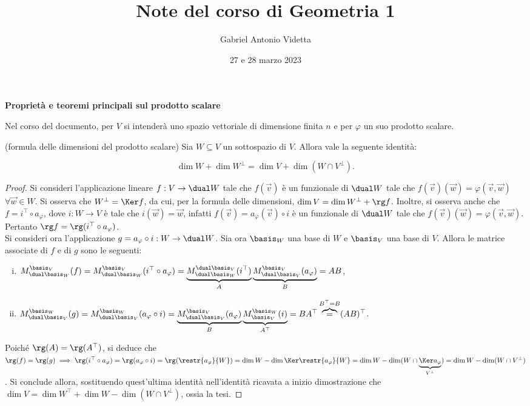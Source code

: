 \documentclass[11pt]{article}
\title{\textbf{Note del corso di Geometria 1}}
\author{Gabriel Antonio Videtta}
\date{27 e 28 marzo 2023}
\begin{document}
	
	\maketitle
	
	\begin{center}
		\Large \textbf{Proprietà e teoremi principali sul prodotto scalare}
	\end{center}
	
	\begin{note}
		Nel corso del documento, per $V$ si intenderà uno spazio vettoriale di dimensione
		finita $n$ e per $\varphi$ un suo prodotto scalare.
	\end{note}
	
	\begin{proposition} (formula delle dimensioni del prodotto scalare)
		Sia $W \subseteq V$ un sottospazio di $V$. Allora vale la seguente identità:
		
		\[ \dim W + \dim W^\perp = \dim V + \dim (W \cap V^\perp). \]
	\end{proposition}

	\begin{proof}
		Si consideri l'applicazione lineare $f : V \to \dual W$ tale che $f(\vec v)$ è un funzionale di $\dual W$ tale che
		$f(\vec v)(\vec w) = \varphi(\vec v, \vec w)$ $\forall \vec w \in W$. Si osserva che $W^\perp = \Ker f$, da cui,
		per la formula delle dimensioni, $\dim V = \dim W^\perp + \rg f$. Inoltre, si osserva anche che
		$f = i^\top \circ a_\varphi$, dove $i : W \to V$ è tale che $i(\vec w) = \vec w$, infatti $f(\vec v) = a_\varphi(\vec v) \circ i$ è un funzionale di $\dual W$ tale che $f(\vec v)(\vec w) = \varphi(\vec v, \vec w)$. Pertanto
		$\rg f = \rg (i^\top \circ a_\varphi)$. \\
		
		Si consideri ora l'applicazione $g = a_\varphi \circ i : W \to \dual W$. Sia ora $\basis_W$ una base di $W$ e
		$\basis_V$ una base di $V$. Allora le matrice associate di $f$ e di $g$ sono le seguenti:
		
		\begin{enumerate}[(i)]
			\item $M_{\dual \basis_W}^{\basis_V}(f) = M_{\dual \basis_W}^{\basis_V}(i^\top \circ a_\varphi) =
			\underbrace{M_{\dual \basis_W}^{\dual \basis_V}(i^\top)}_A \underbrace{M_{\dual \basis_V}^{\basis_V}(a_\varphi)}_B = AB$,
			\item $M_{\dual \basis_V}^{\basis_W}(g) = M_{\dual \basis_V}^{\basis_W}(a_\varphi \circ i) =
			\underbrace{M_{\dual \basis_V}^{\basis_V}(a_\varphi)}_B \underbrace{M_{\basis_V}^{\basis_W}(i)}_{A^\top} = BA^\top \overbrace{=}^{B^\top = B} (AB)^\top$.
		\end{enumerate}
	
		Poiché $\rg(A) = \rg(A^\top)$, si deduce che $\rg(f) = \rg(g) \implies \rg(i^\top \circ a_\varphi) = \rg(a_\varphi \circ i) = \rg(\restr{a_\varphi}{W}) = \dim W - \dim \Ker \restr{a_\varphi}{W} = \dim W - \dim (W \cap \underbrace{\Ker a_\varphi}_{V^\perp}) = \dim W - \dim (W \cap V^\perp)$. Si conclude allora, sostituendo quest'ultima
		identità nell'identità ricavata a inizio dimostrazione che $\dim V = \dim W^\top + \dim W - \dim (W \cap V^\perp)$,
		ossia la tesi.
	\end{proof}
\end{document}
